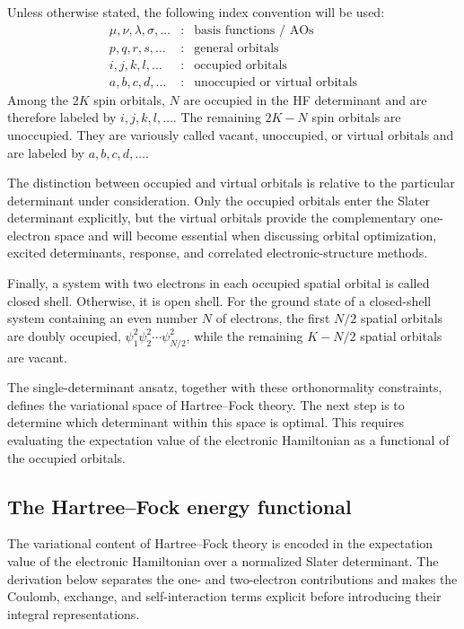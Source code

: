 \documentclass[11pt,a4paper,titlepage]{article}
\numberwithin{equation}{section}
\begin{document}
Unless otherwise stated, the following index convention will be used:
\begin{equation}
  \begin{array}{ccl}
    \mu,\nu,\lambda,\sigma,\ldots
      &:& \text{basis functions / AOs}
    \\[1mm]
    p,q,r,s,\ldots
      &:& \text{general orbitals}
    \\[1mm]
    i,j,k,l,\ldots
      &:& \text{occupied orbitals}
    \\[1mm]
    a,b,c,d,\ldots
      &:& \text{unoccupied or virtual orbitals}
  \end{array}
\end{equation}
Among the $2K$ spin orbitals, $N$ are occupied in the HF determinant and are
therefore labeled by $i,j,k,l,\ldots$. The remaining $2K-N$ spin orbitals are
unoccupied. They are variously called vacant, unoccupied, or
virtual orbitals and are labeled by $a,b,c,d,\ldots$.

The distinction between occupied and virtual orbitals is relative to the
particular determinant under consideration. Only the occupied orbitals enter
the Slater determinant explicitly, but the virtual orbitals provide the
complementary one-electron space and will become essential when discussing
orbital optimization, excited determinants, response, and correlated
electronic-structure methods.

Finally, a system with two electrons in each occupied spatial orbital
is called closed shell. Otherwise, it is open shell. For the
ground state of a closed-shell system containing an even number $N$ of
electrons, the first $N/2$ spatial orbitals are doubly occupied,
$\psi_1^2\psi_2^2\cdots\psi_{N/2}^2$,
while the remaining $K-N/2$ spatial orbitals are vacant.

The single-determinant ansatz, together with these orthonormality constraints,
defines the variational space of Hartree--Fock theory. The next step is to
determine which determinant within this space is optimal. This requires
evaluating the expectation value of the electronic Hamiltonian as a functional
of the occupied orbitals.

\subsection{The Hartree--Fock energy functional}

The variational content of Hartree--Fock theory is encoded in the expectation
value of the electronic Hamiltonian over a normalized Slater determinant. The
derivation below separates the one- and two-electron contributions and makes
the Coulomb, exchange, and self-interaction terms explicit before introducing
their integral representations.
\end{document}
